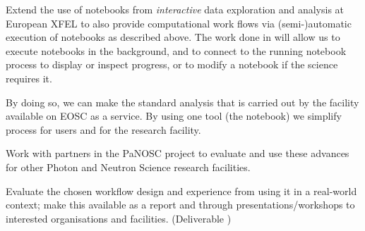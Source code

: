 \begin{task}[
  title=Reproducible X-ray crystallography workflows at European XFEL,
  id=reproducibility-xfel,
  lead=XFEL,
  PM=36,
  wphases={6-48},
  partners={XFEL}
  ]
\begin{compactitem}
  \item Extend the use of notebooks from \emph{interactive} data
    exploration and analysis at European XFEL to also provide
    computational work flows via (semi-)automatic execution of
    notebooks as described above. The work done in
     will allow us to execute notebooks in
    the background, and to connect to the running notebook process to
    display or inspect progress, or to modify a notebook if the
    science requires it.

    By doing so, we can make the standard analysis that is carried out
    by the facility available on EOSC as a service. By using one tool
    (the notebook) we simplify process for users and for the research
    facility.

  \item Work with partners in the PaNOSC project to evaluate and use
    these advances for other Photon and Neutron Science research
    facilities.

  \item Evaluate the chosen workflow design and experience from using
    it in a real-world context; make this available as a report and
    through presentations/workshops to interested organisations and
    facilities. (Deliverable )
  \end{compactitem}

  \end{task}

